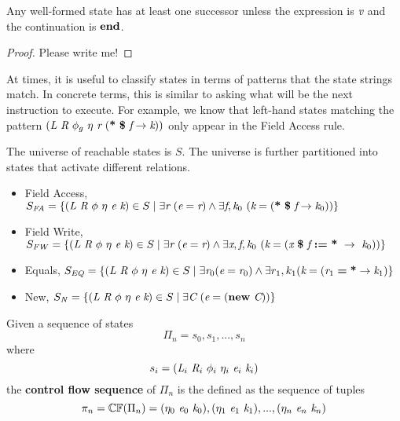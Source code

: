 \begin{lemma}
\label{lem:succ}
Any well-formed state has at least one successor unless the expression is $\emph{v}$ and the continuation is $\textbf{end}$.
\end{lemma}
\begin{proof}
Please write me!
\end{proof}

At times, it is useful to classify states in terms of patterns that the state strings match. In concrete terms, this is similar to asking what will be the next instruction to execute. For example, we know that left-hand states matching the pattern $ \lp \cfgnt{L}\ \cfgnt{R}\ \phi_g\ \eta\ \cfgnt{r}\ \lp \cfgt{*}\ \cfgt{\$}\ \cfgnt{f} \rightarrow \cfgnt{k}\rp \rp$ only appear in the Field Access rule.

\begin{definition}
The universe of reachable states is $S$. The universe is further partitioned into states that activate different relations.
\begin{itemize}
\item Field Access, $S_\mathit{FA} = \{( \emph{L}\ \emph{R}\ \phi\ \eta\ \emph{e}\ \emph{k} ) \in S \mid \exists \emph{r}\ (\emph{e} = \emph{r}) \wedge \exists \emph{f},\emph{k}_0\ (\emph{k} = ( \textbf{*}\ \textbf{\$}\ \emph{f} \rightarrow \emph{k}_0)) \}$
\item Field Write,  $S_\mathit{FW} = \{\lp \cfgnt{L}\ \cfgnt{R}\ \phi\ \eta\ \cfgnt{e}\ \cfgnt{k} \rp \in S \mid \exists \cfgnt{r}\ (\cfgnt{e} = \cfgnt{r}) \wedge \exists \cfgnt{x},\cfgnt{f},\cfgnt{k}_0\ (\cfgnt{k} = \lp \cfgnt{x}\ \cfgt{\$}\ \cfgnt{f}\ \cfgt{:=}\ \cfgt{*}\ \rightarrow\ \cfgnt{k}_0\rp) \}$
\item Equals, $S_\mathit{EQ} = \{( \emph{L}\ \emph{R}\ \phi\ \eta\ \emph{e}\ \emph{k} ) \in S \mid \exists \emph{r}_0 (\emph{e} = \emph{r}_0) \wedge \exists r_1, k_1(\emph{k} = ( \emph{r}_1\; \textbf{=}\; \textbf{*} \rightarrow \emph{k}_1) \}$
\item New, $S_\mathit{N} = \{\lp \cfgnt{L}\ \cfgnt{R}\ \phi\ \eta\ \cfgnt{e}\ \cfgnt{k} \rp \in S \mid \exists \cfgnt{C}\ (\cfgnt{e} = \lp \cfgt{new}\ \cfgnt{C}\rp) \}$
\end{itemize} 
\end{definition}


\begin{definition}
Given a sequence of states $$\Pi_n = s_0,s_1,...,s_n$$ where $$s_i = (\cfgnt{L}_i\ \cfgnt{R}_i\ \phi_i\ \eta_i\ \cfgnt{e}_i\ \cfgnt{k}_i )$$ the \textbf{control flow sequence} of $\Pi_n$ is the defined as the sequence of tuples $$ \pi_n = \mathbb{CF}(\Pi_n) = (\eta_0\ \cfgnt{e}_0\ \cfgnt{k}_0),(\eta_1\ \cfgnt{e}_1\ \cfgnt{k}_1),...,(\eta_n\ \cfgnt{e}_n\ \cfgnt{k}_n)$$
\end{definition}

